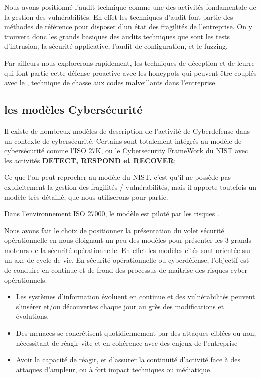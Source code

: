 
Nous avons positionné l'audit technique comme une des activités fondamentale de la gestion des vulnérabilités.
En effet les techniques d'audit font partie des méthodes de référence pour disposer d'un état des fragilités de l'entreprise. On y trouvera donc les grands basiques des audits techniques que sont les tests d'intrusion, la sécurité applicative, l'audit de configuration, et le fuzzing.

Par ailleurs nous explorerons rapidement, les techniques de déception et de leurre qui font partie cette défense proactive avec les honeypots qui peuvent être couplés avec le , technique de chasse aux codes malveillants dans l'entreprise.
 

\subsection{les modèles Cybersécurité}

Il existe de nombreux modèles de description de l'activité de Cyberdefense dans un contexte de cybersécurité.
Certains sont totalement intégrés au modèle de cybersécurité comme l'ISO 27K, ou le Cybersecurity FrameWork du NIST  avec les activités \textbf{DETECT, RESPOND et RECOVER};


Ce que l'on peut reprocher au modèle du NIST, c'est qu'il ne possède pas explicitement la gestion des fragilités / vulnérabilités, mais il apporte toutefois un modèle très détaillé, que nous utiliserons pour partie.

Dans l'environnement ISO 27000, le modèle est piloté par les risques  .

Nous avons fait le choix de positionner la présentation du volet sécurité opérationnelle en nous éloignant un peu des modèles pour présenter les 3 grands moteurs de la sécurité opérationnelle. En effet les modèles cités sont orientée sur un axe de cycle de vie.
En sécurité opérationnelle ou cyberdéfense, l'objectif est de conduire en continue et de frond des processus de maitrise des risques cyber opérationnels.
\begin{itemize}
  \item Les systèmes d'information évoluent en continue et des vulnérabilités peuvent s'insérer et/ou découvertes chaque jour au grès des modifications et évolutions,
  \item Des menaces se concrétisent quotidiennement par des attaques ciblées ou non, nécessitant de réagir vite et en cohérence avec des enjeux de l'entreprise
  \item Avoir la capacité de réagir, et d'assurer la continuité d'activité face à des attaques d'ampleur, ou à fort impact techniques ou médiatique.
\end{itemize}

